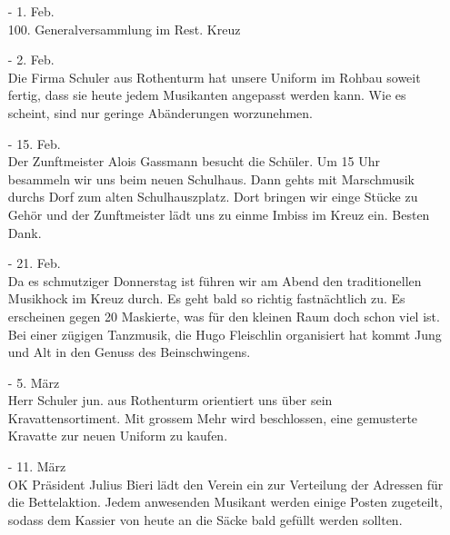 \begin{multicols}{2}
\begin{itemize}
        \item[-]1. Feb.\\
        100. Generalversammlung im Rest. Kreuz

        \item[-]2. Feb.\\
        Die Firma Schuler aus Rothenturm hat unsere Uniform im
        Rohbau soweit fertig, dass sie heute jedem Musikanten
        angepasst werden kann. Wie es scheint, sind nur geringe
        Abänderungen worzunehmen.

        \item[-]15. Feb.\\
        Der Zunftmeister Alois Gassmann besucht die
        Schüler. Um 15 Uhr besammeln wir uns beim neuen
        Schulhaus. Dann gehts mit Marschmusik durchs Dorf
        zum alten Schulhauszplatz. Dort bringen wir einge Stücke zu
        Gehör und der Zunftmeister lädt uns zu einme Imbiss
        im Kreuz ein. Besten Dank.

        \item[-]21. Feb.\\
        Da es schmutziger Donnerstag ist führen wir am
        Abend den traditionellen Musikhock im Kreuz durch.
        Es geht bald so richtig fastnächtlich zu. Es erscheinen gegen
        20 Maskierte, was für den kleinen Raum doch schon viel ist.
        Bei einer zügigen Tanzmusik, die Hugo Fleischlin organisiert
        hat kommt Jung und Alt in den Genuss des Beinschwingens.

        \item[-]5. März\\
        Herr Schuler jun. aus Rothenturm orientiert uns über sein
        Kravattensortiment. Mit grossem Mehr wird beschlossen,
        eine gemusterte Kravatte zur neuen Uniform zu kaufen.

        \item[-]11. März\\
        OK Präsident Julius Bieri lädt den Verein ein zur Verteilung
        der Adressen für die Bettelaktion. Jedem
        anwesenden Musikant werden einige Posten zugeteilt, sodass
        dem Kassier von heute an die Säcke bald gefüllt werden sollten.



    \end{itemize}

\end{multicols}
